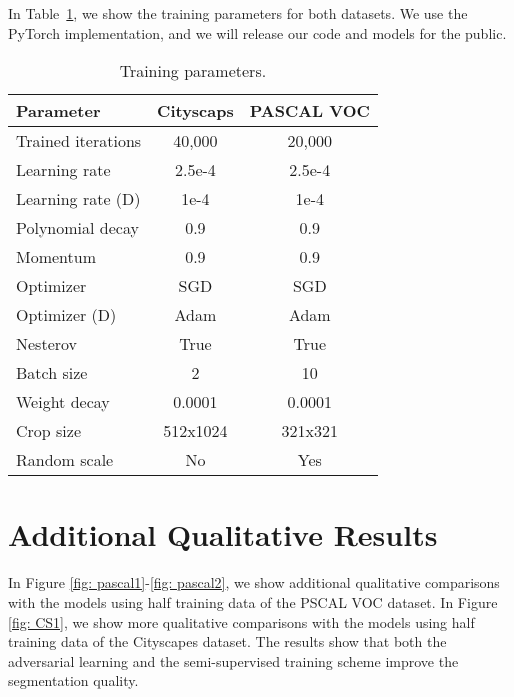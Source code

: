 \documentclass{bmvc2k}
\begin{document}
	In Table~\ref{table:train_param}, we show the training parameters for both datasets.
We use the PyTorch implementation, and we will release our code and models for the public.
	\vspace{1cm}
	\begin{table}[h]
		\caption{Training parameters.}
		\centering
		\small
		\label{table:train_param}
		\begin{tabular}{l|c|c}
			\toprule
			Parameter & Cityscaps & PASCAL VOC \\
			\midrule
			Trained iterations & 40,000 & 20,000 \\
			Learning rate & 2.5e-4 &  2.5e-4\\
			Learning rate (D) & 1e-4 &  1e-4\\
			Polynomial decay & 0.9 & 0.9 \\
			Momentum & 0.9 & 0.9 \\
			Optimizer & SGD & SGD \\
			Optimizer (D) & Adam & Adam \\
			Nesterov & True & True \\ 
			Batch size & 2 & 10 \\
			Weight decay & 0.0001 & 0.0001 \\
			Crop size & 512x1024 & 321x321 \\
			Random scale & No & Yes \\
			
			
			\bottomrule
		\end{tabular}
	\end{table}
	
	\section{Additional Qualitative Results}
	
	In Figure \ref{fig: pascal1}-\ref{fig: pascal2}, we show additional qualitative comparisons with the models using half training data of the PSCAL VOC dataset.
In Figure \ref{fig: CS1}, we show more qualitative comparisons with the models using half training data of the Cityscapes dataset.
The results show that both the adversarial learning and the semi-supervised training scheme improve the segmentation quality.
	
	\newcommand{\imgrowvoc}[1]{
		\hspace{-4mm}
		\texttt{[image: imgs/voc\_results/img/\#1.jpg]}& \hspace{-4mm}
		\texttt{[image: imgs/voc\_results/voc\_gt/\#1.png]} &\hspace{-4mm}
		\texttt{[image: imgs/voc\_results/voc\_baseline/\#1.png]} &\hspace{-4mm}
		\texttt{[image: imgs/voc\_results/voc\_Ladv/\#1.png]} &\hspace{-4mm}
		\texttt{[image: imgs/voc\_results/voc\_Ladv+Lsemi/\#1.png]} \\
	}
	
\end{document}
